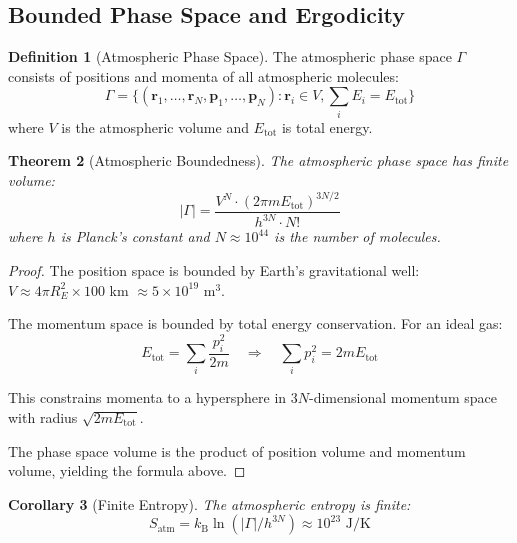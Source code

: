 \documentclass[twocolumn,10pt,a4paper]{article}
\newtheorem{theorem}{Theorem}[section]
\newtheorem{corollary}[theorem]{Corollary}
\theoremstyle{definition}
\newtheorem{definition}[theorem]{Definition}
\theoremstyle{remark}
\newcommand{\kB}{k_{\mathrm{B}}}
\begin{document}
\subsection{Bounded Phase Space and Ergodicity}

\begin{definition}[Atmospheric Phase Space]
\label{def:phase_space}
The atmospheric phase space $\Gamma$ consists of positions and momenta of all atmospheric molecules:
\begin{equation}
    \Gamma = \{(\mathbf{r}_1, \ldots, \mathbf{r}_N, \mathbf{p}_1, \ldots, \mathbf{p}_N) : \mathbf{r}_i \in V, \sum_i E_i = E_{\text{tot}}\}
\end{equation}
where $V$ is the atmospheric volume and $E_{\text{tot}}$ is total energy.
\end{definition}

\begin{theorem}[Atmospheric Boundedness]
\label{thm:bounded}
The atmospheric phase space has finite volume:
\begin{equation}
    |\Gamma| = \frac{V^N \cdot (2\pi m E_{\text{tot}})^{3N/2}}{h^{3N} \cdot N!}
\end{equation}
where $h$ is Planck's constant and $N \approx 10^{44}$ is the number of molecules.
\end{theorem}

\begin{proof}
The position space is bounded by Earth's gravitational well: $V \approx 4\pi R_E^2 \times 100$ km $\approx 5 \times 10^{19}$ m$^3$.

The momentum space is bounded by total energy conservation. For an ideal gas:
\begin{equation}
    E_{\text{tot}} = \sum_i \frac{p_i^2}{2m} \quad \Rightarrow \quad \sum_i p_i^2 = 2mE_{\text{tot}}
\end{equation}

This constrains momenta to a hypersphere in $3N$-dimensional momentum space with radius $\sqrt{2mE_{\text{tot}}}$.

The phase space volume is the product of position volume and momentum volume, yielding the formula above.
\end{proof}

\begin{corollary}[Finite Entropy]
\label{cor:finite_entropy}
The atmospheric entropy is finite:
\begin{equation}
    S_{\text{atm}} = \kB \ln(|\Gamma|/h^{3N}) \approx 10^{23} \text{ J/K}
\end{equation}
\end{corollary}
\end{document}
